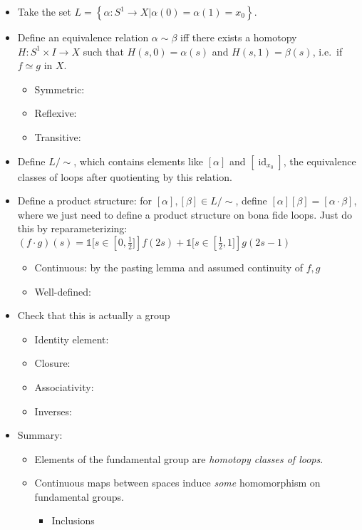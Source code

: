 \begin{itemize}
\tightlist
\item
  Take the set
  \(L = \left\{{\alpha: S^1\to X \mathrel{\Big|}\alpha(0) = \alpha(1) = x_0}\right\}\).
\item
  Define an equivalence relation \(\alpha \sim \beta\) iff there exists
  a homotopy \(H: S^1 \times I \to X\) such that \(H(s, 0) = \alpha(s)\)
  and \(H(s, 1) = \beta(s)\), i.e.~if \(f\simeq g\) in \(X\).

  \begin{itemize}
  \tightlist
  \item
    Symmetric:
  \item
    Reflexive:
  \item
    Transitive:
  \end{itemize}
\item
  Define \(L/\sim\), which contains elements like \([\alpha]\) and
  \([\operatorname{id}_{x_0}]\), the equivalence classes of loops after
  quotienting by this relation.
\item
  Define a product structure: for \([\alpha], [\beta] \in L/\sim\),
  define \([\alpha][\beta] = [\alpha \cdot \beta]\), where we just need
  to define a product structure on bona fide loops. Just do this by
  reparameterizing:
  \((f\cdot g)(s) = \mathbb{1}[s \in \left[0, \frac{1}{2}]\right]f(2s) + \mathbb{1}[s \in \left[\frac{1}{2}, 1]\right]g(2s-1)\)

  \begin{itemize}
  \tightlist
  \item
    Continuous: by the pasting lemma and assumed continuity of \(f, g\)
  \item
    Well-defined:
  \end{itemize}
\item
  Check that this is actually a group

  \begin{itemize}
  \tightlist
  \item
    Identity element:
  \item
    Closure:
  \item
    Associativity:
  \item
    Inverses:
  \end{itemize}
\item
  Summary:

  \begin{itemize}
  \tightlist
  \item
    Elements of the fundamental group are \emph{homotopy classes of
    loops}.
  \item
    Continuous maps between spaces induce \emph{some} homomorphism on
    fundamental groups.

    \begin{itemize}
    \tightlist
    \item
      Inclusions
    \end{itemize}
  \end{itemize}
\end{itemize}

